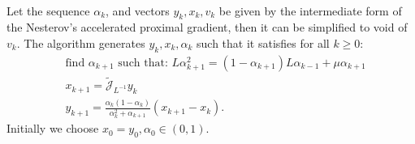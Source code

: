 \documentclass[12pt]{article}
\begin{document}
    \begin{theorem}
        \; \\
        Let the sequence $\alpha_k$, and vectors $y_k, x_k, v_k$ be given by the intermediate form of the Nesterov's accelerated proximal gradient, then it can be simplified to void of $v_k$. 
        The algorithm generates $y_k, x_k, \alpha_k$ such that it satisfies for all $k \ge 0$: 
        \begin{align*}
            & \text{find } \alpha_{k + 1} \text{ such that: }L \alpha_{k + 1}^2 = (1 - \alpha_{k + 1})L \alpha_{k - 1} + \mu \alpha_{k + 1}
            \\
            & x_{k + 1} = \widetilde {\mathcal J}_{L^{-1}} y_k
            \\
            & y_{k + 1} = \frac{\alpha_k(1 - \alpha_k)}{\alpha_k^2 + \alpha_{k + 1}}(x_{k + 1} - x_k). 
        \end{align*}
        Initially we choose $x_0 = y_0, \alpha_0 \in (0, 1)$. 
    \end{theorem}
\end{document}
